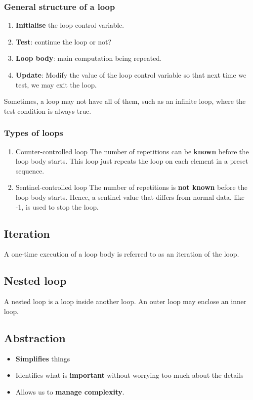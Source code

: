 \documentclass[11pt]{article}
\begin{document}
\subsubsection{General structure of a loop}
\label{sec:orga606a09}
\begin{enumerate}
\item \textbf{Initialise} the loop control variable.
\item \textbf{Test}: continue the loop or not?
\item \textbf{Loop body}: main computation being repeated.
\item \textbf{Update}: Modify the value of the loop control variable so that next time we test, we may exit the loop.
\end{enumerate}

Sometimes, a loop may not have all of them, such as an infinite loop, where the test condition is always true.

\subsubsection{Types of loops}
\label{sec:org67c2e51}
\begin{enumerate}
\item Counter-controlled loop
The number of repetitions can be \textbf{known} before the loop body starts. This loop just repeats the loop on each element in a preset sequence.

\item Sentinel-controlled loop
The number of repetitions is \textbf{not known} before the loop body starts. Hence, a sentinel value that differs from normal data, like -1, is used to stop the loop.
\end{enumerate}

\subsection{Iteration}
\label{sec:org574340a}
A one-time execution of a loop body is referred to as an iteration of the loop.

\subsection{Nested loop}
\label{sec:orgc91d4e1}
A nested loop is a loop inside another loop. An outer loop may enclose an inner loop.

 \newpage

\subsection{Abstraction}
\label{sec:org5ad93a1}
\begin{itemize}
\item \textbf{Simplifies} things
\item Identifies what is \textbf{important} without worrying too much about the details
\item Allows us to \textbf{manage complexity}.
\end{itemize}
\end{document}
